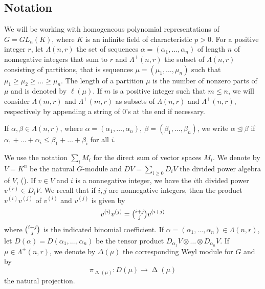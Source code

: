 \documentclass[ALCO,Unicode]{cedram}
\newcommand{\al}{\alpha}
\newcommand{\La}{\Lambda}
\DeclareMathOperator{\D}{\mathrm{\Delta}}
\numberwithin{equation}{section}
\begin{document}
\subsection{Notation}\label{s2.1}
We will be working with homogeneous polynomial representations of $G=GL_n(K)$, where $K$ is an infinite field of characteristic $p>0$.  For a positive integer $r$, let $\Lambda(n,r)$ the set of sequences $\al=(\al_1, \dots, \al_n)$ of length $n$ of nonnegative integers that sum to $r$ and  $\Lambda^+(n,r)$ the subset of $\Lambda(n,r)$ consisting of partitions, that is sequences $\mu=(\mu_1, \dots, \mu_n)$ such that $\mu_1 \ge \mu_2 \ge \dots \ge \mu_n$. The length  of a partition $\mu$ is the number of nonzero parts of $\mu$ and is denoted by $\ell(\mu)$. If $m$ is a positive integer such that $m \le n$, we will consider $\La(m,r)$ and $\La^+(m,r)$ as subsets of $\La(n,r)$ and $\La^+(n,r)$, respectively by appending a string of $0$'s at the end if necessary.  

If $\al, \beta \in \Lambda(n,r)$, where $\al=(\al_1,\dots, \al_n), \ \beta = (\beta_1,\dots,\beta_n)$, we write $\al \unlhd \beta$ if $\al_1+\dots+\al_i \le \beta_1+\dots+\beta_i$ for all $i$.

We use the notation $\sum_i M_i$ for the direct sum of vector spaces $M_i$. We denote by $V=K^n$ be the natural $G$-module and $DV=\sum_{i\geq 0}D_iV$ the divided power algebra of $V$, (\cite[Section I.4]{ABW}). If $v \in V$ and $i$ is a nonnegative integer, we have the $i$th divided power $v^{(r)} \in D_iV$. We recall that if $i,j$ are nonnegative integers, then the product $v^{(i)}v^{(j)}$ of $v^{(i)}$ and $v^{(j)}$ is given by \[v^{(i)}v^{(j)}=\tbinom{i+j}{j}v^{(i+j)}\] where $\tbinom{i+j}{j}$ is the indicated binomial coefficient. If $\al=(\al_1,\dots, \al_n) \in \Lambda(n,r)$, let $D(\al)=D(\al_1,\dots,\al_n)$ be the tensor product $D_{\al_1}V\otimes \dots \otimes D_{\al_n}V$. If $\mu \in \Lambda^+(n,r)$, we denote by $\Delta(\mu)$ the corresponding Weyl module for $G$ and by \[{\pi}_{\D(\mu)} : D(\mu) \to \D(\mu)\] the natural projection.
\end{document}
